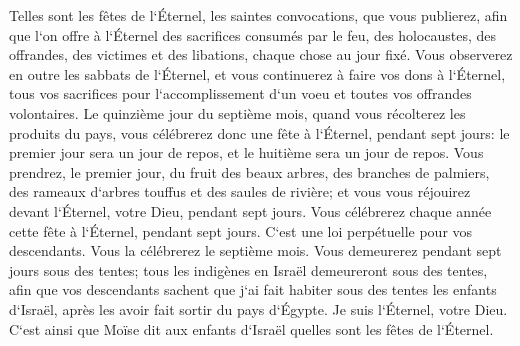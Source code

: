 \verse Telles sont les fêtes de l`Éternel, les saintes convocations, que vous publierez, afin que l`on offre à l`Éternel des sacrifices consumés par le feu, des holocaustes, des offrandes, des victimes et des libations, chaque chose au jour fixé. 
\verse Vous observerez en outre les sabbats de l`Éternel, et vous continuerez à faire vos dons à l`Éternel, tous vos sacrifices pour l`accomplissement d`un voeu et toutes vos offrandes volontaires. 
\verse Le quinzième jour du septième mois, quand vous récolterez les produits du pays, vous célébrerez donc une fête à l`Éternel, pendant sept jours: le premier jour sera un jour de repos, et le huitième sera un jour de repos. 
\verse Vous prendrez, le premier jour, du fruit des beaux arbres, des branches de palmiers, des rameaux d`arbres touffus et des saules de rivière; et vous vous réjouirez devant l`Éternel, votre Dieu, pendant sept jours. 
\verse Vous célébrerez chaque année cette fête à l`Éternel, pendant sept jours. C`est une loi perpétuelle pour vos descendants. Vous la célébrerez le septième mois. 
\verse Vous demeurerez pendant sept jours sous des tentes; tous les indigènes en Israël demeureront sous des tentes, 
\verse afin que vos descendants sachent que j`ai fait habiter sous des tentes les enfants d`Israël, après les avoir fait sortir du pays d`Égypte. Je suis l`Éternel, votre Dieu. 
\verse C`est ainsi que Moïse dit aux enfants d`Israël quelles sont les fêtes de l`Éternel. 

